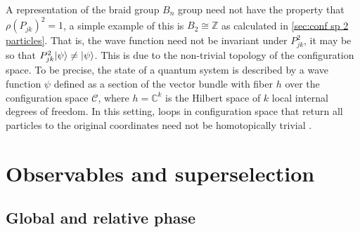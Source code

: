 \documentclass[a4paper,10pt,oneside]{book}
\theoremstyle{plain}
\theoremstyle{definition}
\theoremstyle{remark}
\DeclarePairedDelimiter\ket{\lvert}{\rangle}
\begin{document}
A representation of the braid group $B_n$ group need not have the property that $\rho(P_{jk})^2 = 1$, a simple example of this is $B_2 \cong \mathbb{Z}$ as calculated in \cref{sec:conf sp 2 particles}. That is, the wave function need not be invariant under $P_{jk}^2$, it may be so that $P_{jk}^2\ket{\psi} \ne \ket{\psi}$. This is due to the non-trivial topology of the configuration space. To be precise, the state of a quantum system is described by a wave function $\psi$ defined as a section of the vector bundle with fiber $h$ over the configuration space $\mathcal{C}$, where $h = \mathbb{C}^k$ is the Hilbert space of $k$ local internal degrees of freedom. In this setting, loops in configuration space that return all particles to the original coordinates need not be homotopically trivial \cite{nakahara}.






































\section{Observables and superselection}\label{sec:observables}

\subsection{Global and relative phase}\label{sec:global vs relative phase}
\end{document}
